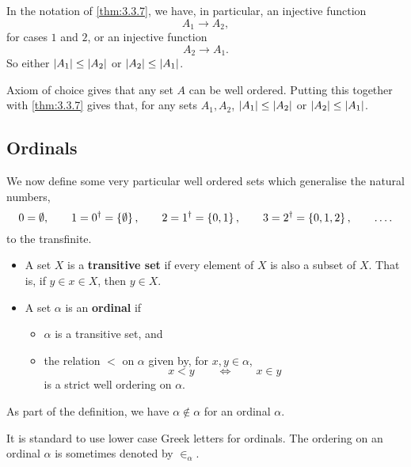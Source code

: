 
\begin{remark2}
In the notation of \ref{thm:3.3.7}, we have, in particular, an injective function
$$ A_1 \to A_2, $$
for cases $ 1 $ and $ 2 $, or an injective function
$$ A_2 \to A_1. $$
So either $ \left\lvert A_1 \right\rvert \le \left\lvert A_2 \right\rvert $ or $ \left\lvert A_2 \right\rvert \le \left\lvert A_1 \right\rvert $.
\end{remark2}

Axiom of choice gives that any set $ A $ can be well ordered. Putting this together with \ref{thm:3.3.7} gives that, for any sets $ A_1, A_2 $, $ \left\lvert A_1 \right\rvert \le \left\lvert A_2 \right\rvert $ or $ \left\lvert A_2 \right\rvert \le \left\lvert A_1 \right\rvert $.

\pagebreak

\subsection{Ordinals}

We now define some very particular well ordered sets which generalise the natural numbers,
$$ 0 = \emptyset, \qquad 1 = 0^\dagger = \left\{ \emptyset \right\}, \qquad 2 = 1^\dagger = \left\{ 0, 1 \right\}, \qquad 3 = 2^\dagger = \left\{ 0, 1, 2 \right\}, \qquad \dots. $$
to the transfinite.

\begin{definition}
\hfill
\begin{itemize}
\item A set $ X $ is a \textbf{transitive set} if every element of $ X $ is also a subset of $ X $. That is, if $ y \in x \in X $, then $ y \in X $.
\item A set $ \alpha $ is an \textbf{ordinal} if
\begin{itemize}
\item $ \alpha $ is a transitive set, and
\item the relation $ < $ on $ \alpha $ given by, for $ x, y \in \alpha $,
$$ x < y \qquad \iff \qquad x \in y $$
is a strict well ordering on $ \alpha $.
\end{itemize}
\end{itemize}
\end{definition}

\begin{note}
As part of the definition, we have $ \alpha \notin \alpha $ for an ordinal $ \alpha $.
\end{note}

It is standard to use lower case Greek letters for ordinals. The ordering on an ordinal $ \alpha $ is sometimes denoted by $ \in_\alpha $.

